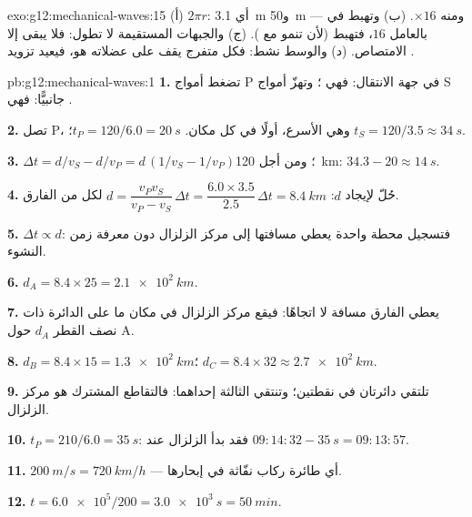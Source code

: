 \begin{solution}{exo:g12:mechanical-waves:15}
(أ) $2\pi r$: أي \qty{3.1}{m} و\qty{50}{m} --- ومنه $\times 16$.
(ب) وتهبط  في  بالعامل $16$، فتهبط  (لأن
 تنمو مع ). (ج) والجبهات المستقيمة لا
تطول: فلا يبقى إلا الامتصاص. (د) والوسط نشط: فكل
متفرج يقف على  عضلاته هو، فيعيد تزويد .
\end{solution}

\begin{solution}{pb:g12:mechanical-waves:1}
\textbf{1.} تضغط أمواج P في جهة الانتقال: فهي ؛ وتهزّ أمواج S
جانبيًّا: فهي .

\textbf{2.} تصل P، وهي الأسرع، أولًا في كل مكان.
$t_P = 120/6.0 = \qty{20}{s}$؛ $t_S = 120/3.5 \approx \qty{34}{s}$.

\textbf{3.} $\Delta t = d/v_S - d/v_P = d\,(1/v_S - 1/v_P)$؛ ومن أجل
\qty{120}{km}: $34.3 - 20 \approx \qty{14}{s}$.

\textbf{4.} حُلّ لإيجاد $d$: $d = \dfrac{v_P v_S}{v_P - v_S}\,\Delta t
= \dfrac{6.0 \times 3.5}{2.5}\,\Delta t = \qty{8.4}{km}$ لكل 
من الفارق.

\textbf{5.} $\Delta t \propto d$: فتسجيل محطة واحدة يعطي
مسافتها إلى مركز الزلزال دون معرفة زمن النشوء.

\textbf{6.} $d_A = 8.4 \times 25 = \qty{2.1e2}{km}$.

\textbf{7.} يعطي الفارق مسافة لا اتجاهًا: فيقع مركز الزلزال
في مكان ما على الدائرة ذات نصف القطر $d_A$ حول A.

\textbf{8.} $d_B = 8.4 \times 15 = \qty{1.3e2}{km}$؛
$d_C = 8.4 \times 32 \approx \qty{2.7e2}{km}$.

\textbf{9.} تلتقي دائرتان في نقطتين؛ وتنتقي الثالثة إحداهما:
فالتقاطع المشترك هو مركز الزلزال.

\textbf{10.} $t_P = 210/6.0 = \qty{35}{s}$: فقد بدأ الزلزال عند
$09{:}14{:}32 - \qty{35}{s} = 09{:}13{:}57$.

\textbf{11.} $\qty{200}{m/s} = \qty{720}{km/h}$ --- أي طائرة ركاب نفّاثة
في إبحارها.

\textbf{12.} $t = \num{6.0e5}/200 = \qty{3.0e3}{s} = \qty{50}{min}$.


\end{solution}
